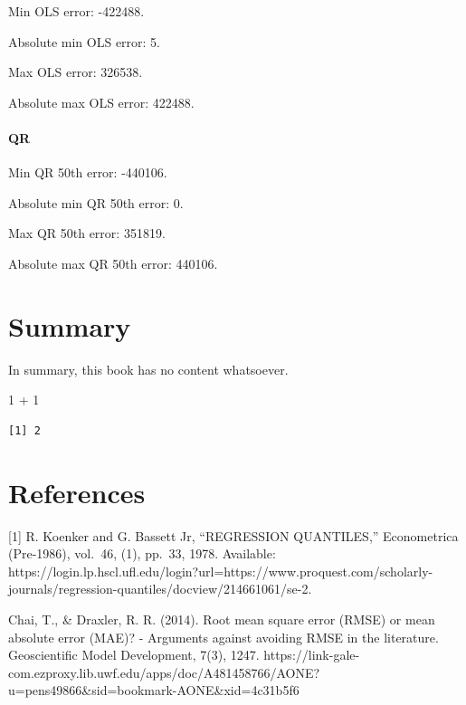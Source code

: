 \documentclass[
  letterpaper,
  DIV=11,
  numbers=noendperiod]{scrreprt}
\newenvironment{Shaded}{\begin{snugshade}}{\end{snugshade}}
\newcommand{\DecValTok}[1]{\textcolor[rgb]{0.68,0.00,0.00}{#1}}
\newcommand{\SpecialCharTok}[1]{\textcolor[rgb]{0.37,0.37,0.37}{#1}}
\newlength{\cslhangindent}
\newlength{\cslentryspacingunit} %
\newenvironment{CSLReferences}[2] %
 {%
  \setlength{\parindent}{0pt}
  \ifodd #1
  \let\oldpar\par
  \def\par{\hangindent=\cslhangindent\oldpar}
  \fi
  \setlength{\parskip}{#2\cslentryspacingunit}
 }%
 {}
\begin{document}
Min OLS error: -422488.

Absolute min OLS error: 5.

Max OLS error: 326538.

Absolute max OLS error: 422488.

\hypertarget{qr}{%
\subsubsection{QR}\label{qr}}

Min QR 50th error: -440106.

Absolute min QR 50th error: 0.

Max QR 50th error: 351819.

Absolute max QR 50th error: 440106.


\hypertarget{summary}{%
\chapter{Summary}\label{summary}}

In summary, this book has no content whatsoever.

\begin{Shaded}
\begin{Highlighting}[]
\DecValTok{1} \SpecialCharTok{+} \DecValTok{1}
\end{Highlighting}
\end{Shaded}

\begin{verbatim}
[1] 2
\end{verbatim}


\hypertarget{references}{%
\chapter*{References}\label{references}}


{[}1{]} R. Koenker and G. Bassett Jr, ``REGRESSION QUANTILES,''
Econometrica (Pre-1986), vol.~46, (1), pp.~33, 1978. Available:
https://login.lp.hscl.ufl.edu/login?url=https://www.proquest.com/scholarly-journals/regression-quantiles/docview/214661061/se-2.

\noindent [2] Chai, T., \& Draxler, R. R. (2014). Root mean square error
(RMSE) or mean absolute error (MAE)? - Arguments against avoiding RMSE
in the literature. Geoscientific Model Development, 7(3), 1247.
https://link-gale-com.ezproxy.lib.uwf.edu/apps/doc/A481458766/AONE?u=pens49866\&sid=bookmark-AONE\&xid=4c31b5f6

\hypertarget{refs}{}
\begin{CSLReferences}{0}{0}
\end{CSLReferences}
\end{document}
